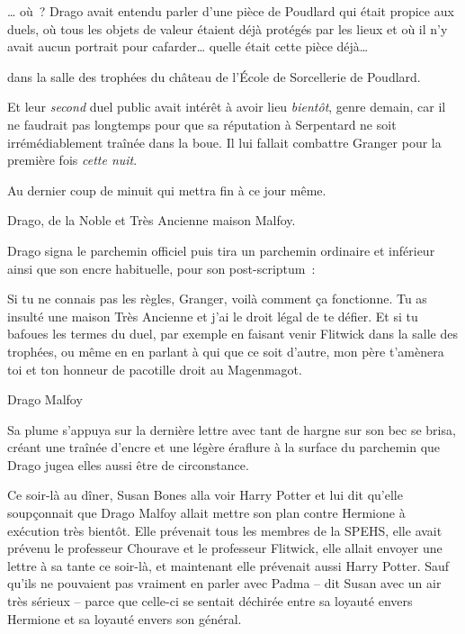 … où~? Drago avait entendu parler d'une pièce de Poudlard qui était propice aux duels, où tous les objets de valeur étaient déjà protégés par les lieux et où il n'y avait aucun portrait pour cafarder… quelle était cette pièce déjà…

\begin{writtenNote}
dans la salle des trophées du château de l'École de Sorcellerie de Poudlard. \end{writtenNote}

Et leur \emph{second} duel public avait intérêt à avoir lieu \emph{bientôt}, genre demain, car il ne faudrait pas longtemps pour que sa réputation à Serpentard ne soit irrémédiablement traînée dans la boue. Il lui fallait combattre Granger pour la première fois \emph{cette nuit}.

\begin{writtenNote}
Au dernier coup de minuit qui mettra fin à ce jour même.

Drago, de la Noble et Très Ancienne maison Malfoy.
\end{writtenNote}

Drago signa le parchemin officiel puis tira un parchemin ordinaire et inférieur ainsi que son encre habituelle, pour son post-scriptum~:

\begin{writtenNote}Si tu ne connais pas les règles, Granger, voilà comment ça fonctionne. Tu as insulté une maison Très Ancienne et j'ai le droit légal de te défier. Et si tu bafoues les termes du duel, par exemple en faisant venir Flitwick dans la salle des trophées, ou même en en parlant à qui que ce soit d'autre, mon père t'amènera toi et ton honneur de pacotille droit au Magenmagot.

Drago Malfoy
\end{writtenNote}

Sa plume s'appuya sur la dernière lettre avec tant de hargne sur son bec se brisa, créant une traînée d'encre et une légère éraflure à la surface du parchemin que Drago jugea elles aussi être de circonstance.

\later

Ce soir-là au dîner, Susan Bones alla voir Harry Potter et lui dit qu'elle soupçonnait que Drago Malfoy allait mettre son plan contre Hermione à exécution très bientôt. Elle prévenait tous les membres de la SPEHS, elle avait prévenu le professeur Chourave et le professeur Flitwick, elle allait envoyer une lettre à sa tante ce soir-là, et maintenant elle prévenait aussi Harry Potter. Sauf qu'ils ne pouvaient pas vraiment en parler avec Padma -- dit Susan avec un air très sérieux -- parce que celle-ci se sentait déchirée entre sa loyauté envers Hermione et sa loyauté envers son général.

